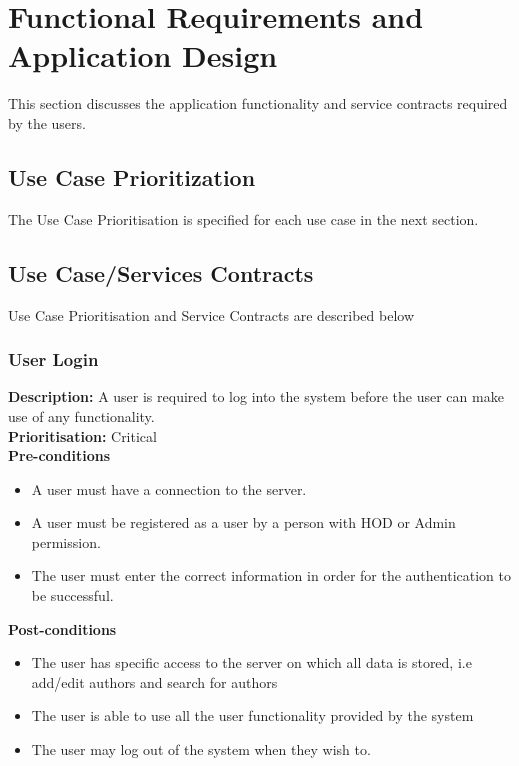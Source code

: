 \documentclass[a4paper]{article}
\begin{document}
    \pagebreak


    
















\section{Functional Requirements and Application Design}
	This section discusses the application functionality and service contracts required by the users.
    \subsection{Use Case Prioritization}
    	The Use Case Prioritisation is specified for each use case in the next section.
	
    \subsection{Use Case/Services Contracts}
	    Use Case Prioritisation and Service Contracts are described below
	 
    \subsubsection{User Login}
    	\textbf{Description:}  A user is required to log into the system before the user can make use of any functionality.
    	\\
        \textbf{Prioritisation:} Critical\\
        
        
          \textbf{Pre-conditions}
        \begin{itemize}
            \item A user must have a connection to the server.
            \item A user must be registered as a user by a person with HOD or Admin permission.
            \item The user must enter the correct information in order for the authentication to be successful.
        \end{itemize}
        
        \textbf{Post-conditions}
         \begin{itemize}
            \item The user has specific access to the server on which all data is stored, i.e add/edit authors and search for authors
            \item The user is able to use all the user functionality provided by the system 
            \item The user may log out of the system when they wish to.
        \end{itemize}
        
\end{document}
